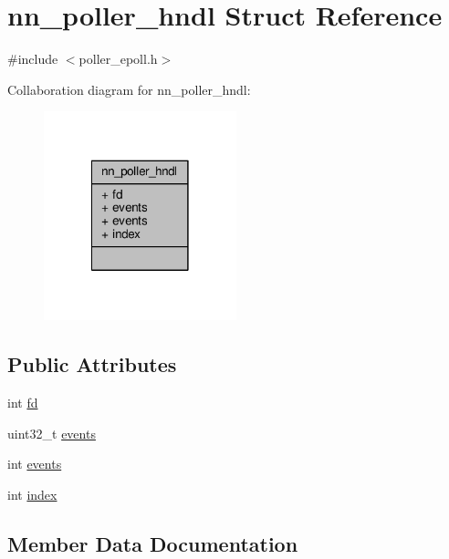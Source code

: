 \hypertarget{structnn__poller__hndl}{}\section{nn\+\_\+poller\+\_\+hndl Struct Reference}
\label{structnn__poller__hndl}


{\ttfamily \#include $<$poller\+\_\+epoll.\+h$>$}



Collaboration diagram for nn\+\_\+poller\+\_\+hndl\+:\nopagebreak
\begin{figure}[H]
\begin{center}
\leavevmode
\includegraphics[width=158pt]{structnn__poller__hndl__coll__graph}
\end{center}
\end{figure}
\subsection*{Public Attributes}
\begin{DoxyCompactItemize}
\item 
int \hyperlink{structnn__poller__hndl_a771d23018b76a0624c147c37b61c3494}{fd}
\item 
uint32\+\_\+t \hyperlink{structnn__poller__hndl_a8e8b359d3ccfcfae5aa53f4c13a0e573}{events}
\item 
int \hyperlink{structnn__poller__hndl_ae1ebcb140ef6540a8bd528eea997985f}{events}
\item 
int \hyperlink{structnn__poller__hndl_ac6bda1e59ff90470cea88327c6d023d1}{index}
\end{DoxyCompactItemize}


\subsection{Member Data Documentation}

